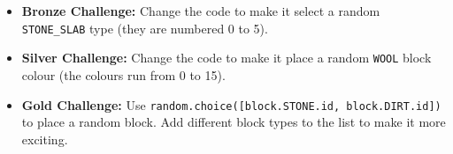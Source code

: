 \documentclass{geocraft-worksheet}
\begin{document}
\begin{itemize}
\item\textbf{Bronze Challenge:} Change the code to make it
  select a random \lstinline{STONE_SLAB} type (they are numbered 0 to 5).

\item\textbf{Silver Challenge:} Change the code to make it
  place a random \lstinline{WOOL} block colour (the colours run from 0 to 15).

\item\textbf{Gold Challenge:} Use \lstinline{random.choice([block.STONE.id, block.DIRT.id])} 
to place a random block. Add different block types to the list to make it more exciting.
\end{itemize}
\end{document}

